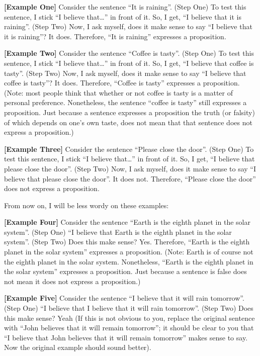 \documentclass[
]{book}
\begin{document}
\textbf{{[}Example One{]}} Consider the sentence ``It is raining''. (Step One) To test this sentence, I stick ``I believe that\ldots{}'' in front of it. So, I get, ``I believe that it is raining''. (Step Two) Now, I ask myself, does it make sense to say ``I believe that it is raining''? It does. Therefore, ``It is raining'' expresses a proposition.

\textbf{{[}Example Two{]}} Consider the sentence ``Coffee is tasty''. (Step One) To test this sentence, I stick ``I believe that\ldots{}'' in front of it. So, I get, ``I believe that coffee is tasty''. (Step Two) Now, I ask myself, does it make sense to say ``I believe that coffee is tasty''? It does. Therefore, ``Coffee is tasty'' expresses a proposition. (Note: most people think that whether or not coffee is tasty is a matter of personal preference. Nonetheless, the sentence ``coffee is tasty'' still expresses a proposition. Just because a sentence expresses a proposition the truth (or falsity) of which depends on one's own taste, does not mean that that sentence does not express a proposition.)

\textbf{{[}Example Three{]}} Consider the sentence ``Please close the door''. (Step One) To test this sentence, I stick ``I believe that\ldots{}'' in front of it. So, I get, ``I believe that please close the door''. (Step Two) Now, I ask myself, does it make sense to say ``I believe that please close the door''. It does not. Therefore, ``Please close the door'' does not express a proposition.

From now on, I will be less wordy on these examples:

\textbf{{[}Example Four{]}} Consider the sentence ``Earth is the eighth planet in the solar system''. (Step One) ``I believe that Earth is the eighth planet in the solar system''. (Step Two) Does this make sense? Yes. Therefore, ``Earth is the eighth planet in the solar system'' expresses a proposition. (Note: Earth is of course not the eighth planet in the solar system. Nonetheless, ``Earth is the eighth planet in the solar system'' expresses a proposition. Just because a sentence is false does not mean it does not express a proposition.)

\textbf{{[}Example Five{]}} Consider the sentence ``I believe that it will rain tomorrow''. (Step One) ``I believe that I believe that it will rain tomorrow''. (Step Two) Does this make sense? Yeah (If this is not obvious to you, replace the original sentence with ``John believes that it will remain tomorrow''; it should be clear to you that ``I believe that John believes that it will remain tomorrow'' makes sense to say. Now the original example should sound better).
\end{document}
